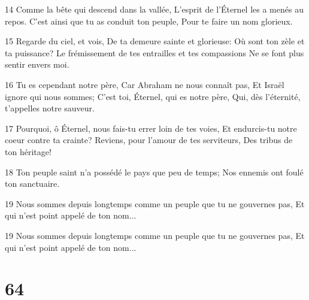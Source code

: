 \par 14 Comme la bête qui descend dans la vallée, L'esprit de l'Éternel les a menés au repos. C'est ainsi que tu as conduit ton peuple, Pour te faire un nom glorieux.
\par 15 Regarde du ciel, et vois, De ta demeure sainte et glorieuse: Où sont ton zèle et ta puissance? Le frémissement de tes entrailles et tes compassions Ne se font plus sentir envers moi.
\par 16 Tu es cependant notre père, Car Abraham ne nous connaît pas, Et Israël ignore qui nous sommes; C'est toi, Éternel, qui es notre père, Qui, dès l'éternité, t'appelles notre sauveur.
\par 17 Pourquoi, ô Éternel, nous fais-tu errer loin de tes voies, Et endurcis-tu notre coeur contre ta crainte? Reviens, pour l'amour de tes serviteurs, Des tribus de ton héritage!
\par 18 Ton peuple saint n'a possédé le pays que peu de temps; Nos ennemis ont foulé ton sanctuaire.
\par 19 Nous sommes depuis longtemps comme un peuple que tu ne gouvernes pas, Et qui n'est point appelé de ton nom...
\par 19 Nous sommes depuis longtemps comme un peuple que tu ne gouvernes pas, Et qui n'est point appelé de ton nom...

\chapter{64}

